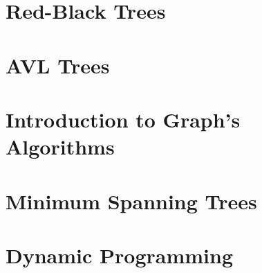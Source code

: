 \documentclass[a4paper,10pt]{article}
\begin{document}
\section{Red-Black Trees}

\section{AVL Trees}

\section{Introduction to Graph's Algorithms}

\section{Minimum Spanning Trees}

\section{Dynamic Programming}

\fontsize{8}{9}\selectfont


\clearpage
\end{document}
